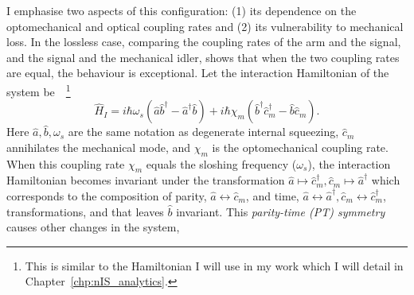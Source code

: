 I emphasise two aspects of this configuration: (1) its dependence on the optomechanical and optical coupling rates and (2) its vulnerability to mechanical loss. %
In the lossless case, comparing the coupling rates of the arm and the signal, and the signal and the mechanical idler, shows that when the two coupling rates are equal, the behaviour is exceptional.
Let the interaction Hamiltonian of the system be~\cite{liBroadbandSensitivityImprovement2020}~\footnote{This is similar to the Hamiltonian I will use in my work which I will detail in Chapter~\ref{chp:nIS_analytics}.}
\begin{equation}\label{eq:sWLC_HI}
\hat{H}_I=i\hbar\omega_s(\hat{a}\hat{b}^\dag-\hat{a}^\dag\hat{b})+i\hbar\chi_m(\hat{b}^\dag\hat{c}_m^\dag-\hat{b}\hat{c}_m).
\end{equation}
Here $\hat a, \hat b, \omega_s$ are the same notation as degenerate internal squeezing, $\hat{c}_m$ annihilates the mechanical mode, and $\chi_m$ is the optomechanical coupling rate. When this coupling rate $\chi_m$ equals the sloshing frequency ($\omega_s$), the interaction Hamiltonian becomes invariant under the transformation $\hat a\mapsto\hat{c}_m^\dag, \hat{c}_m\mapsto\hat a^\dag$ which corresponds to the composition of parity, $\hat a\leftrightarrow \hat{c}_m$, and time, $\hat a\leftrightarrow \hat a^\dag,\hat {c}_m\leftrightarrow \hat {c}_m^\dag$, transformations, and that leaves $\hat b$ invariant. This \emph{parity-time (PT) symmetry} causes other changes in the system, 
